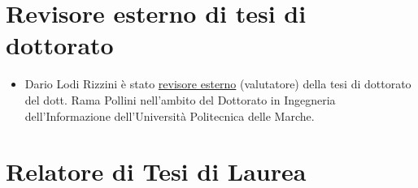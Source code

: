 \documentclass[11pt]{article}
\begin{document}
\section*{Revisore esterno di tesi di dottorato}

\begin{itemize}
\item Dario Lodi Rizzini \`e stato \underline{revisore esterno} (valutatore) della tesi di dottorato del dott. Rama Pollini 
  nell'ambito del Dottorato in Ingegneria dell'Informazione dell'Universit\`a Politecnica delle Marche. 
\end{itemize}


\section*{Relatore di Tesi di Laurea}
\end{document}
